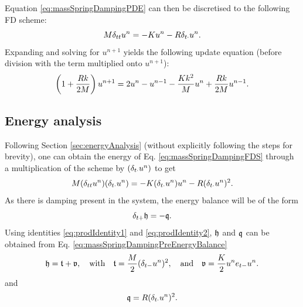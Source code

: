 Equation \eqref{eq:massSpringDampingPDE} can then be discretised to the following FD scheme:
\begin{equation}\label{eq:massSpringDampingFDS}
    M\delta_{tt} u^n = -Ku^n - R\delta_{t\cdot} u^n.
\end{equation}
Expanding and solving for $u^{n+1}$ yields the following update equation (before division with the term multiplied onto $u^{n+1}$):
\begin{equation}\label{eq:massSpringDampingUpdate}
    \left(1+\frac{Rk}{2M}\right)u^{n+1} = 2 u^n - u^{n-1} - \frac{Kk^2}{M}u^n + \frac{Rk}{2M}u^{n-1}.
\end{equation}

\subsection{Energy analysis}
Following Section \ref{sec:energyAnalysis} (without explicitly following the steps for brevity), one can obtain the energy of Eq. \eqref{eq:massSpringDampingFDS} through a multiplication of the scheme by $(\delta_{t\cdot} u^n)$ to get
\begin{equation}\label{eq:massSpringDampingPreEnergyBalance}
    M(\delta_{tt} u^n)(\delta_{t\cdot} u^n) = -K(\delta_{t\cdot} u^n)u^n - R(\delta_{t\cdot} u^n)^2.
\end{equation}
As there is damping present in the system, the energy balance will be of the form 
\begin{equation*}
    \delta_{t+} \mathfrak{h} = -\mathfrak{q}.
\end{equation*}
Using identities \eqref{eq:prodIdentity1} and \eqref{eq:prodIdentity2}, $\mathfrak{h}$ and $\mathfrak{q}$ can be obtained from Eq. \eqref{eq:massSpringDampingPreEnergyBalance} 
\begin{equation}\label{eq:energyBalanceMassSpringDamper}
    \mathfrak{h} = \mathfrak{t} + \mathfrak{v}, \quad \text{with} \quad
    \mathfrak{t} = \frac{M}{2}(\delta_{t-}u^n)^2, \quad \text{and} \quad \mathfrak{v} = \frac{K}{2}u^n e_{t-}u^n.
\end{equation} 
and
\begin{equation}\label{eq:massDampingEnergy}
    \mathfrak{q} = R(\delta_{t\cdot} u^n)^2.
\end{equation}

